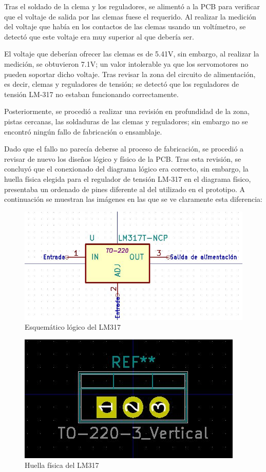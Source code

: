 \begin{itemize}
   Tras el soldado de la clema y los reguladores, se alimentó a la \ac{PCB} para verificar que el voltaje de salida por las clemas fuese el requerido. Al realizar la medición del voltaje que había en los contactos de las clemas usando un voltímetro, se detectó que este voltaje era muy superior al que debería ser.
   
   El voltaje que deberían ofrecer las clemas es de 5.41V, sin embargo, al realizar la medición, se obtuvieron 7.1V; un valor intolerable ya que los servomotores no pueden soportar dicho voltaje. Tras revisar la zona del circuito de alimentación, es decir, clemas y reguladores de tensión; se detectó que los reguladores de tensión LM-317 no estaban funcionando correctamente.
   
   Posteriormente, se procedió a realizar una revisión en profundidad de la zona, pistas cercanas, las soldaduras de las clemas y reguladores; sin embargo no se encontró ningún fallo de fabricación o ensamblaje.
   
   Dado que el fallo no parecía deberse al proceso de fabricación, se procedió a revisar de nuevo los diseños lógico y físico de la \ac{PCB}. Tras esta revisión, se concluyó que el conexionado del diagrama lógico era correcto, sin embargo, la huella física elegida para el regulador de tensión LM-317 en el diagrama físico, presentaba un ordenado de pines diferente al del utilizado en el prototipo. A continuación se muestran las imágenes en las que se ve claramente esta diferencia:
   
    \begin{figure}[H]
    \centering 
    \includegraphics[width=0.65\linewidth]{pictures/FailPinout2.JPG}
    \caption{Esquemático lógico del LM317}
    \label{fig:kdiagram}
    \end{figure}
    
    \begin{figure}[H]
    \centering 
    \includegraphics[width=0.55\linewidth]{pictures/FailPinout3.JPG}
    \caption{Huella física del LM317}
    \label{fig:kdiagram}
    \end{figure}
    

\end{itemize}
